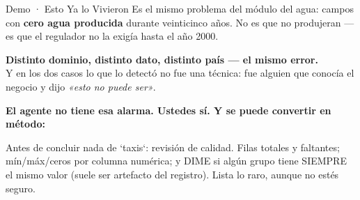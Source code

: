 \documentclass[aspectratio=169, 11pt]{beamer}
\begin{document}
\begin{frame}[shrink=5]{Demo · Esto Ya lo Vivieron}
  \vspace{-5pt}
  {\scriptsize\color{textMuted}
   Es el mismo problema del módulo del agua: campos con \textbf{cero agua
   producida} durante veinticinco años. No es que no produjeran --- es que el
   regulador no la exigía hasta el año 2000.}
  \vspace{2pt}
  \begin{tcolorbox}[colback=arcaGray, colframe=arcaDark, boxrule=0pt,
    leftrule=4pt, arc=3pt, left=10pt, right=10pt, top=3pt, bottom=3pt]
    {\scriptsize\color{arcaDark}\bfseries
     Distinto dominio, distinto dato, distinto país --- el mismo error.}\\[4pt]
    {\scriptsize\color{textMuted}
     Y en los dos casos lo que lo detectó no fue una técnica: fue alguien que
     conocía el negocio y dijo \emph{«esto no puede ser»}.}
  \end{tcolorbox}
  \vspace{2pt}
  {\scriptsize\color{arcaDark}\bfseries
   El agente no tiene esa alarma. Ustedes sí. Y se puede convertir en
   método:}
  \vspace{2pt}
  \begin{prompt}
Antes de concluir nada de `taxis`: revisión de
calidad. Filas totales y faltantes; mín/máx/ceros
por columna numérica; y DIME si algún grupo tiene
SIEMPRE el mismo valor (suele ser artefacto del
registro). Lista lo raro, aunque no estés seguro.
  \end{prompt}
\end{frame}
\end{document}
